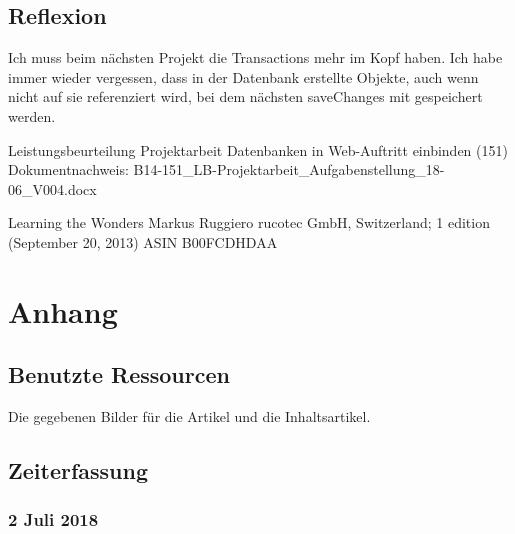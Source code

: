 \documentclass[a4paper, 11pt]{article}
\begin{document}
\subsection{Reflexion}

Ich muss beim nächsten Projekt die Transactions mehr im Kopf haben. Ich habe immer wieder vergessen, dass in der Datenbank erstellte Objekte, auch wenn nicht auf sie referenziert wird, bei dem nächsten saveChanges mit gespeichert werden.

\begin{thebibliography}{9}
Leistungsbeurteilung Projektarbeit
Datenbanken in Web-Auftritt einbinden (151)
Dokumentnachweis: B14-151\_LB-Projektarbeit\_Aufgabenstellung\_18-06\_V004.docx

Learning the Wonders
Markus Ruggiero
rucotec GmbH, Switzerland; 1 edition (September 20, 2013)
ASIN B00FCDHDAA

\end{thebibliography}

\section{Anhang}

\subsection{Benutzte Ressourcen}

Die gegebenen Bilder für die Artikel und die Inhaltsartikel.

\subsection{Zeiterfassung}

\subsubsection{2 Juli 2018}
\end{document}
